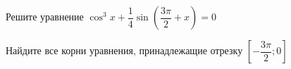 \begin{ex}
	\begin{condition}
		\begin{enumcols}[label=\asbuk*)]
			\item Решите уравнение \( \cos^3 x +\dfrac{1}{4} \sin{\left(\dfrac{3\pi}{2}+x\right)}= 0 \)
			\item Найдите все корни уравнения, принадлежащие отрезку \( \left[-\dfrac{3\pi}{2};0\right] \)
		\end{enumcols}
	\end{condition}
\end{ex}